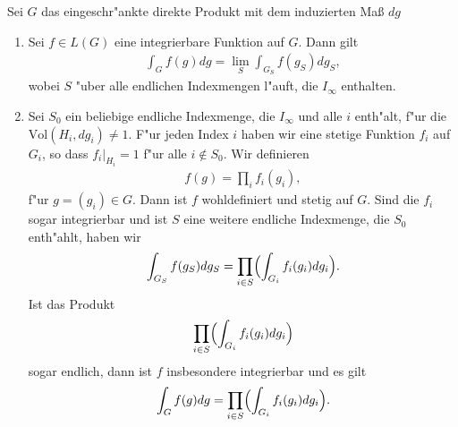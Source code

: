 		\begin{proposition}%
			Sei $G$ das eingeschr"ankte direkte Produkt mit dem induzierten Maß $dg$
			\begin{enumerate}[label=(\roman*)]
				\item Sei $f \in L(G)$ eine integrierbare Funktion auf $G$. Dann gilt
					\begin{align*}
						\int_G f(g)dg = \lim_S \int_{G_S} f(g_S) dg_S,
					\end{align*}
					wobei $S$ "uber alle endlichen Indexmengen l"auft, die $I_\infty$ enthalten.
				\item Sei $S_0$ ein beliebige endliche Indexmenge, die $I_\infty$ und alle $i$ enth"alt, f"ur die $\text{Vol}(H_i, dg_i) \not= 1$. 
					F"ur jeden Index $i$ haben wir eine stetige Funktion $f_i$ auf $G_i$, so dass $f_i |_{H_i} = 1$ f"ur alle $i \notin S_0$. 
					Wir definieren
					\begin{align*}
						f(g) = \prod_{i}f_{i}(g_i),
					\end{align*}
					f"ur $g=(g_i) \in G$. 
					Dann ist $f$ wohldefiniert und stetig auf $G$. 
					Sind die $f_i$ sogar integrierbar und ist $S$ eine weitere endliche Indexmenge, die $S_0$ enth"ahlt, haben wir
					\begin{align}\label{eq:satz:integration}
						\int_{G_S} f(g_S) dg_S = \prod_{i \in S}\Bigl(\int_{G_i} f_i (g_i)dg_i\Bigr).
					\end{align}
					Ist das Produkt
					\begin{align*}
						\prod_{i \in S}\Bigl(\int_{G_i} f_i (g_i)dg_i\Bigr)
					\end{align*}
					sogar endlich, dann ist $f$ insbesondere integrierbar und es gilt
					\begin{align*}
						\int_{G} f(g) dg = \prod_{i \in S}\Bigl(\int_{G_i} f_i (g_i)dg_i\Bigr).
					\end{align*}	
			\end{enumerate}
		\end{proposition}
		
